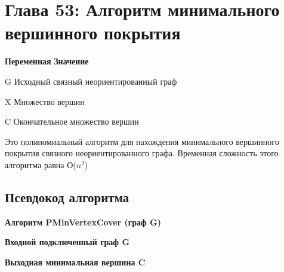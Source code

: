 
\chapter*{Глава 53: Алгоритм минимального вершинного покрытия}
\vspace{-0.4cm}

\textbf{Переменная}	\hspace*{15mm} \textbf{Значение}

\vspace{\baselineskip}
\vspace{-0.4cm}
G      \hspace*{10mm}     Исходный связный неориентированный граф

\vspace{\baselineskip}
\vspace{-0.4cm}
X	   \hspace*{10mm}     Множество вершин

\vspace{\baselineskip}
\vspace{-0.4cm}
C	   \hspace*{10mm}     Окончательное множество вершин

\vspace{\baselineskip}
Это полиномиальный алгоритм для нахождения минимального вершинного покрытия связного неориентированного графа. Временная сложность этого алгоритма равна О($n^2$)

\section*{Псевдокод алгоритма}
\vspace{-0.2cm}

\vspace{\baselineskip}
\vspace{-0.4cm}
\textbf{Алгоритм PMinVertexCover (граф G)}

\vspace{\baselineskip}
\vspace{-0.4cm}
\textbf{Входной подключенный граф G}

\vspace{\baselineskip}
\vspace{-0.4cm}
\textbf{Выходная минимальная вершина C}

